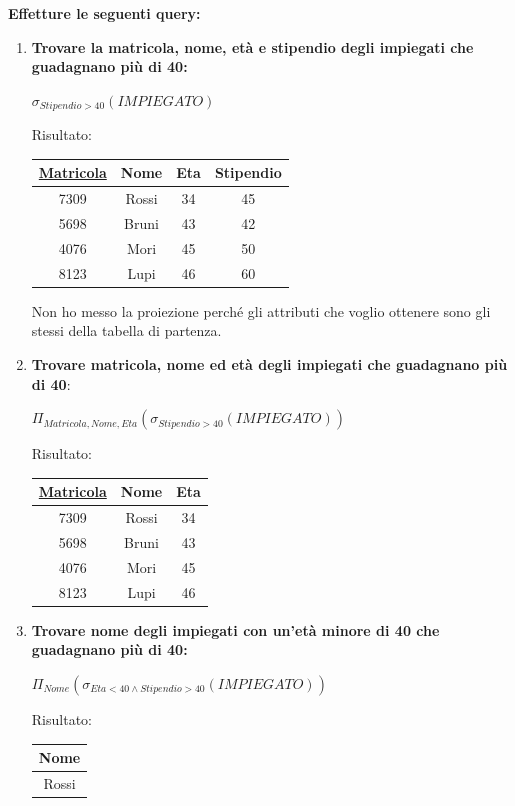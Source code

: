 \documentclass{article}
\begin{document}
\textbf{Effetture le seguenti query:}
\begin{enumerate}
    \item \textbf{Trovare la matricola, nome, età e stipendio degli impiegati che guadagnano più di 40:}

    $\sigma_{Stipendio>40}(IMPIEGATO)$

    Risultato: 
    \begin{tabular}{|c|c|c|c|}
        \hline
        \textbf{\underline{Matricola}} & \textbf{Nome} & \textbf{Eta} & \textbf{Stipendio} \\
        \hline
        7309 & Rossi & 34 & 45 \\
        \hline
        5698 & Bruni & 43 & 42 \\
        \hline
             4076 & Mori & 45 & 50\\
        \hline
             8123 & Lupi & 46 & 60 \\
        \hline
    \end{tabular}
    
    Non ho messo la proiezione perché gli attributi che voglio ottenere sono gli stessi della tabella di partenza.
    
    \item \textbf{Trovare matricola, nome ed età degli impiegati che guadagnano più di 40}:

    $\Pi_{Matricola,Nome,Eta}(\sigma_{Stipendio > 40}(IMPIEGATO))$

    Risultato: 
    \begin{tabular}{|c|c|c|}
        \hline
        \textbf{\underline{Matricola}} & \textbf{Nome} & \textbf{Eta}  \\
        \hline
        7309 & Rossi & 34  \\
        \hline
        5698 & Bruni & 43  \\
        \hline
             4076 & Mori & 45 \\
        \hline
             8123 & Lupi & 46  \\
        \hline
    \end{tabular}
    \item \textbf{Trovare nome degli impiegati con un'età minore di 40 che guadagnano più di 40:}

    $\Pi_{Nome}(\sigma_{Eta < 40 \land Stipendio > 40}(IMPIEGATO))$
    
    Risultato: 
    \begin{tabular}{|c|}
        \hline
        \textbf{Nome}  \\
        \hline
        Rossi\\
        \hline
    \end{tabular}
    
\end{enumerate}
\end{document}
